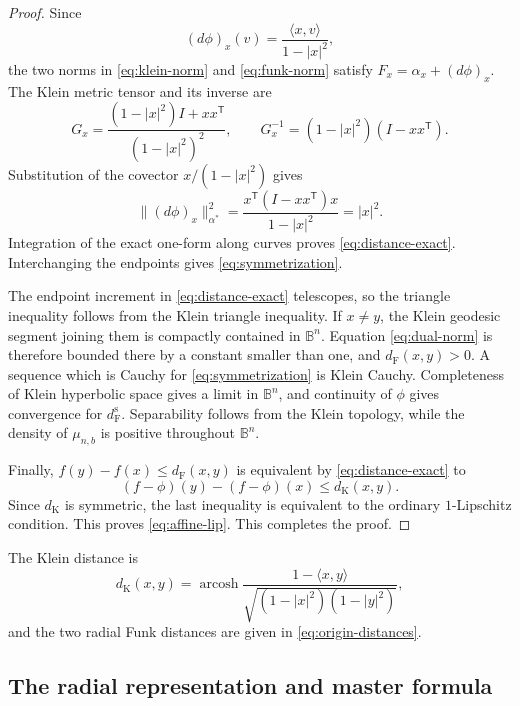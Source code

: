 \documentclass[10pt,a4paper]{amsart}
\numberwithin{equation}{section}
\newcommand{\B}{\mathbb B}
\DeclareMathOperator{\arcosh}{arcosh}
\newcommand{\dF}{d_{\mathrm F}}
\newcommand{\dK}{d_{\mathrm K}}
\begin{document}
\begin{proof}
Since
\[ (d\phi)_x(v)=\frac{\langle x,v\rangle}{1-|x|^2}, \]
the two norms in \eqref{eq:klein-norm} and \eqref{eq:funk-norm} satisfy $F_x=\alpha_x+(d\phi)_x$.  The Klein metric tensor and its inverse are
\[ G_x=\frac{(1-|x|^2)I+xx^{\mathsf T}}{(1-|x|^2)^2}, \qquad G_x^{-1}=(1-|x|^2)(I-xx^{\mathsf T}). \]
Substitution of the covector $x/(1-|x|^2)$ gives
\[ \lVert(d\phi)_x\rVert_{\alpha^*}^2 =\frac{x^{\mathsf T}(I-xx^{\mathsf T})x}{1-|x|^2} =|x|^2. \]
Integration of the exact one-form along curves proves \eqref{eq:distance-exact}.  Interchanging the endpoints gives \eqref{eq:symmetrization}.

The endpoint increment in \eqref{eq:distance-exact} telescopes, so the triangle inequality follows from the Klein triangle inequality.  If $x\ne y$, the Klein geodesic segment joining them is compactly contained in $\B^n$.  Equation \eqref{eq:dual-norm} is therefore bounded there by a constant smaller than one, and $\dF(x,y)>0$.  A sequence which is Cauchy for \eqref{eq:symmetrization} is Klein Cauchy.  Completeness of Klein hyperbolic space gives a limit in $\B^n$, and continuity of $\phi$ gives convergence for $\dF^{\mathrm s}$.  Separability follows from the Klein topology, while the density of $\mu_{n,b}$ is positive throughout $\B^n$.

Finally, $f(y)-f(x)\le\dF(x,y)$ is equivalent by \eqref{eq:distance-exact} to
\[ (f-\phi)(y)-(f-\phi)(x)\le\dK(x,y). \]
Since $\dK$ is symmetric, the last inequality is equivalent to the ordinary $1$-Lipschitz condition.  This proves \eqref{eq:affine-lip}.
	This completes the proof.
\end{proof}

The Klein distance is
\begin{equation}\label{eq:Klein-distance} \dK(x,y)=\arcosh\frac{1-\langle x,y\rangle}{\sqrt{(1-|x|^2)(1-|y|^2)}}, \end{equation}
and the two radial Funk distances are given in \eqref{eq:origin-distances}.

\subsection{The radial representation and master formula}
\end{document}
